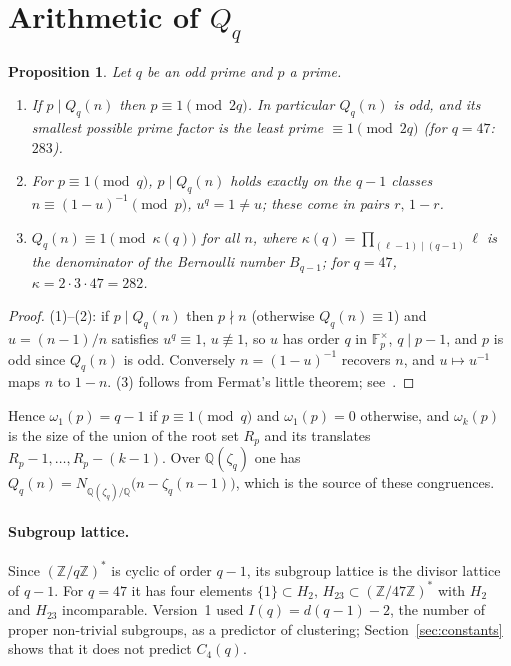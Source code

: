 \documentclass[11pt,a4paper]{article}
\newtheorem{proposition}{Proposition}
\theoremstyle{remark}
\begin{document}
\section{Arithmetic of $Q_q$}\label{sec:arith}
\begin{proposition}\label{prop:roots}
Let $q$ be an odd prime and $p$ a prime.
\begin{enumerate}
\item If $p\mid Q_q(n)$ then $p\equiv 1 \pmod{2q}$. In particular $Q_q(n)$ is odd, and its smallest possible prime factor is the least prime $\equiv 1\pmod{2q}$ (for $q=47$: $283$).
\item For $p\equiv 1\pmod q$, $p\mid Q_q(n)$ holds exactly on the $q-1$ classes $n\equiv (1-u)^{-1}\pmod p$, $u^q=1\ne u$; these come in pairs $r,\,1-r$.
\item $Q_q(n)\equiv 1 \pmod{\kappa(q)}$ for all $n$, where $\kappa(q)=\prod_{(\ell-1)\mid(q-1)}\ell$ is the denominator of the Bernoulli number $B_{q-1}$; for $q=47$, $\kappa=2\cdot3\cdot47=282$.
\end{enumerate}
\end{proposition}
\begin{proof}
(1)--(2): if $p\mid Q_q(n)$ then $p\nmid n$ (otherwise $Q_q(n)\equiv 1$) and $u=(n-1)/n$ satisfies $u^q\equiv 1$, $u\not\equiv1$, so $u$ has order $q$ in $\mathbb{F}_p^\times$, $q\mid p-1$, and $p$ is odd since $Q_q(n)$ is odd. Conversely $n=(1-u)^{-1}$ recovers $n$, and $u\mapsto u^{-1}$ maps $n$ to $1-n$. (3) follows from Fermat's little theorem; see~\cite{BC}.
\end{proof}

Hence $\omega_1(p)=q-1$ if $p\equiv1\pmod q$ and $\omega_1(p)=0$ otherwise, and $\omega_k(p)$ is the size of the union of the root set $R_p$ and its translates $R_p-1,\dots,R_p-(k-1)$. Over $\mathbb{Q}(\zeta_q)$ one has $Q_q(n)=N_{\mathbb{Q}(\zeta_q)/\mathbb{Q}}\bigl(n-\zeta_q(n-1)\bigr)$, which is the source of these congruences.

\paragraph{Subgroup lattice.} Since $(\mathbb{Z}/q\mathbb{Z})^\ast$ is cyclic of order $q-1$, its subgroup lattice is the divisor lattice of $q-1$. For $q=47$ it has four elements $\{1\}\subset H_2,\,H_{23}\subset(\mathbb{Z}/47\mathbb{Z})^\ast$ with $H_2$ and $H_{23}$ incomparable. Version~1 used $I(q)=d(q-1)-2$, the number of proper non-trivial subgroups, as a predictor of clustering; Section~\ref{sec:constants} shows that it does not predict $C_4(q)$.
\end{document}

